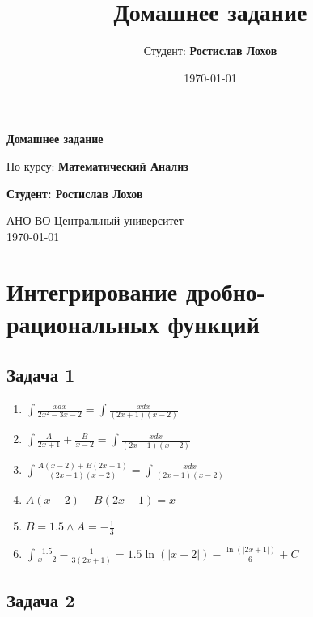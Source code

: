 \documentclass[a4paper,12pt]{article}
\title{Домашнее задание}
\author{Студент: \textbf{Ростислав Лохов}}
\date{\today}
\begin{document}
\begin{titlepage}
	\centering
	\vspace*{1cm}

	\Huge
	\textbf{Домашнее задание}

	\vspace{0.5cm}
	\LARGE
	По курсу: \textbf{Математический Анализ}

	\vspace{1.5cm}

	\textbf{Студент: Ростислав Лохов}

	\vfill

	\Large
	АНО ВО Центральный университет\\
	\vspace{0.3cm}
	\today

\end{titlepage}

\tableofcontents
\newpage

\section{Интегрирование дробно-рациональных функций}

\subsection{Задача 1}

\begin{enumerate}
    \item $\int \frac{xdx}{2x^2-3x-2}=\int \frac{xdx}{(2x+1)(x-2)}$
    \item $\int \frac{A}{2x+1}+\frac{B}{x-2}=\int \frac{xdx}{(2x+1)(x-2)}$
    \item $\int \frac{A(x-2)+B(2x-1)}{(2x-1)(x-2)} = \int \frac{xdx}{(2x+1)(x-2)}$
    \item $A(x-2)+B(2x-1) = x$
    \item $B=1.5 \land A = -\frac{1}{3}$
    \item $\int \frac{1.5}{x-2} - \frac{1}{3(2x+1)} = 1.5\ln(|x-2|)-\frac{\ln(|2x+1|)}{6}+C$
\end{enumerate}

\subsection{Задача 2}
\end{document}
